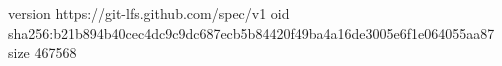 version https://git-lfs.github.com/spec/v1
oid sha256:b21b894b40cec4dc9c9dc687ecb5b84420f49ba4a16de3005e6f1e064055aa87
size 467568
